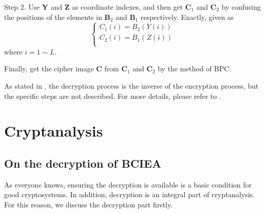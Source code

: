 \documentclass[final,3p,times]{elsarticle}
\begin{document}
\begin{itemize}
	Step 2. Use $\bm{Y}$ and $\bm{Z}$ as coordinate indexes, and then get $\bm{C}_1$ and $\bm{C}_2$ by confusing the positions of the elements in $\bm{B}_2$ and $\bm{B}_1$ respectively. Exactly, given as
	\begin{equation}
	\left\{ \begin{array}{l}
	C_1(i) = B_2(Y(i))\\
	C_2(i) = B_1(Z(i))\\
	\end{array} \right.
	\label{eq:confusion}
	\end{equation}
	where $i=1 \sim L$. 
	
	Finally, get the cipher image $\bm{C}$ from $\bm{C}_1$ and $\bm{C}_2$ by the method of BPC.
\end{itemize}
As stated in \cite{LuX2016OLE}, the decryption process is the inverse of the encryption process, but the specific steps are not described. For more details, please refer to \cite{LuX2016OLE}. 

\section{Cryptanalysis}
\label{sec3:Cryptanalysis}

\subsection{On the decryption of BCIEA}

As everyone knows, ensuring the decryption is available is a basic condition for good cryptosystems. In addition, decryption is an integral part of cryptanalysis. For this reason, we discuss the decryption part firstly.
\end{document}
